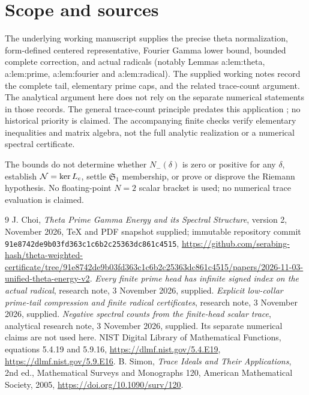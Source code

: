 \documentclass[11pt]{article}
\begin{document}
\section{Scope and sources}\label{scope}
The underlying working manuscript \cite{source} supplies the precise theta normalization, form-defined centered representative, Fourier Gamma lower bound, bounded complete correction, and actual radicals (notably Lemmas a:lem:theta, a:lem:prime, a:lem:fourier and a:lem:radical). The supplied working notes \cite{indexnote,collarnote,traceaudit} record the complete tail, elementary prime caps, and the related trace-count argument. The analytical argument here does not rely on the separate numerical statements in those records. The general trace-count principle predates this application \cite{simon}; no historical priority is claimed. The accompanying finite checks verify elementary inequalities and matrix algebra, not the full analytic realization or a numerical spectral certificate.

The bounds do not determine whether $N_-(\delta)$ is zero or positive for any $\delta$, establish $\mathcal N=\ker L_c$, settle $\mathfrak S_1$ membership, or prove or disprove the Riemann hypothesis. No floating-point $N=2$ scalar bracket is used; no numerical trace evaluation is claimed.
\begin{thebibliography}{9}
 J. Choi, \emph{Theta Prime Gamma Energy and its Spectral Structure}, version 2, November 2026, TeX and PDF snapshot supplied; immutable repository commit \texttt{91e8742de9b03fd363c1c6b2c25363dc861c4515}, \url{https://github.com/serabing-hash/theta-weighted-certificate/tree/91e8742de9b03fd363c1c6b2c25363dc861c4515/papers/2026-11-03-unified-theta-energy-v2}.
 \emph{Every finite prime head has infinite signed index on the actual radical}, research note, 3 November 2026, supplied.
 \emph{Explicit low-collar prime-tail compression and finite radical certificates}, research note, 3 November 2026, supplied.
 \emph{Negative spectral counts from the finite-head scalar trace}, analytical research note, 3 November 2026, supplied. Its separate numerical claims are not used here.
 NIST Digital Library of Mathematical Functions, equations 5.4.19 and 5.9.16, \url{https://dlmf.nist.gov/5.4.E19}, \url{https://dlmf.nist.gov/5.9.E16}.
 B. Simon, \emph{Trace Ideals and Their Applications}, 2nd ed., Mathematical Surveys and Monographs 120, American Mathematical Society, 2005, \url{https://doi.org/10.1090/surv/120}.
\end{thebibliography}
\end{document}
